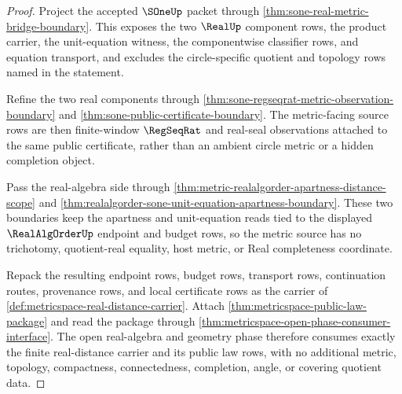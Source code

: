 \begin{proof}
Project the accepted $\SOneUp$ packet through
\autoref{thm:sone-real-metric-bridge-boundary}. This exposes the two
$\RealUp$ component rows, the product carrier, the unit-equation witness, the
componentwise classifier rows, and equation transport, and excludes the
circle-specific quotient and topology rows named in the statement.

Refine the two real components through
\autoref{thm:sone-regseqrat-metric-observation-boundary} and
\autoref{thm:sone-public-certificate-boundary}. The metric-facing source rows
are then finite-window $\RegSeqRat$ and real-seal observations attached to the
same public certificate, rather than an ambient circle metric or a hidden
completion object.

Pass the real-algebra side through
\autoref{thm:metric-realalgorder-apartness-distance-scope} and
\autoref{thm:realalgorder-sone-unit-equation-apartness-boundary}. These two
boundaries keep the apartness and unit-equation reads tied to the displayed
$\RealAlgOrderUp$ endpoint and budget rows, so the metric source has no
trichotomy, quotient-real equality, host metric, or Real completeness
coordinate.

Repack the resulting endpoint rows, budget rows, transport rows, continuation
routes, provenance rows, and local certificate rows as the carrier of
\autoref{def:metricspace-real-distance-carrier}. Attach
\autoref{thm:metricspace-public-law-package} and read the package through
\autoref{thm:metricspace-open-phase-consumer-interface}. The open real-algebra
and geometry phase therefore consumes exactly the finite real-distance carrier
and its public law rows, with no additional metric, topology, compactness,
connectedness, completion, angle, or covering quotient data.
\end{proof}
